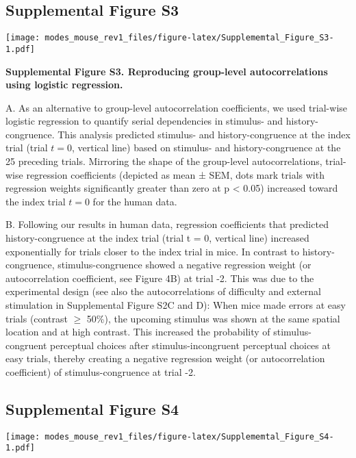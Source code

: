 \documentclass[
]{article}
\begin{document}
\newpage

\hypertarget{supplemental-figure-s3}{%
\subsection{Supplemental Figure S3}\label{supplemental-figure-s3}}

\texttt{[image: modes\_mouse\_rev1\_files/figure-latex/Supplememtal\_Figure\_S3-1.pdf]}

\textbf{Supplemental Figure S3. Reproducing group-level autocorrelations
using logistic regression.}

A. As an alternative to group-level autocorrelation coefficients, we
used trial-wise logistic regression to quantify serial dependencies in
stimulus- and history-congruence. This analysis predicted stimulus- and
history-congruence at the index trial (trial \(t = 0\), vertical line)
based on stimulus- and history-congruence at the 25 preceding trials.
Mirroring the shape of the group-level autocorrelations, trial-wise
regression coefficients (depicted as mean ± SEM, dots mark trials with
regression weights significantly greater than zero at p \textless{}
0.05) increased toward the index trial \(t = 0\) for the human data.

B. Following our results in human data, regression coefficients that
predicted history-congruence at the index trial (trial t = 0, vertical
line) increased exponentially for trials closer to the index trial in
mice. In contrast to history-congruence, stimulus-congruence showed a
negative regression weight (or autocorrelation coefficient, see Figure
4B) at trial -2. This was due to the experimental design (see also the
autocorrelations of difficulty and external stimulation in Supplemental
Figure S2C and D): When mice made errors at easy trials (contrast
\(\geq\) 50\%), the upcoming stimulus was shown at the same spatial
location and at high contrast. This increased the probability of
stimulus-congruent perceptual choices after stimulus-incongruent
perceptual choices at easy trials, thereby creating a negative
regression weight (or autocorrelation coefficient) of
stimulus-congruence at trial -2.

\newpage

\hypertarget{supplemental-figure-s4}{%
\subsection{Supplemental Figure S4}\label{supplemental-figure-s4}}

\texttt{[image: modes\_mouse\_rev1\_files/figure-latex/Supplememtal\_Figure\_S4-1.pdf]}
\end{document}
